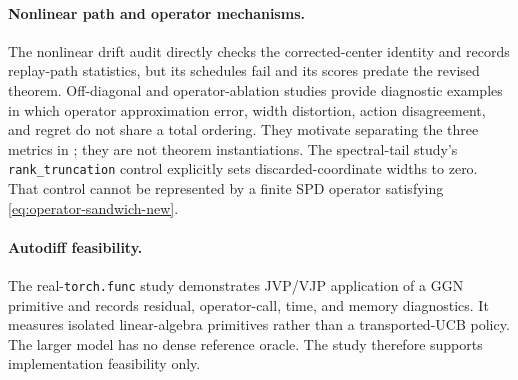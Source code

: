 \begin{table}[t]
  \centering\small
  
  \caption{Legacy fixed-reference linear right-hand-side to regret ratios.
  Each cell is a ratio of aggregate mean right-hand side to aggregate mean
  regret, not a mean of per-run ratios.  These values audit the earlier theorem
  and show numerical vacuity; they are not evaluations of the revised bound.
  Rows using unenclosed spectral or condition-number point estimates are not
  rigorous legacy certificates either.}
  \label{tab:compact-linear-bound-ratios}
\end{table}

\paragraph{Nonlinear path and operator mechanisms.}
The nonlinear drift audit directly checks the corrected-center identity and
records replay-path statistics, but its schedules fail and its scores predate
the revised theorem.  Off-diagonal and operator-ablation studies provide
diagnostic examples in which operator approximation error, width distortion,
action disagreement, and regret do not share a total ordering.  They motivate
separating the three metrics in ; they are not
theorem instantiations.  The spectral-tail study's
\texttt{rank\_truncation} control explicitly sets discarded-coordinate widths
to zero.  That control cannot be represented by a finite SPD operator satisfying
\eqref{eq:operator-sandwich-new}.

\paragraph{Autodiff feasibility.}
The real-\texttt{torch.func} study demonstrates JVP/VJP application of a GGN
primitive and records residual, operator-call, time, and memory diagnostics.
It measures isolated linear-algebra primitives rather than a transported-UCB
policy.  The larger model has no dense reference oracle.  The study therefore
supports implementation feasibility only.

\begin{table}[t]
  \centering\scriptsize
  \caption{Legacy real-autodiff resource audit at history size $512$, ten
  actions, and iterative-solver target original-system residual $10^{-3}$.
  Values summarize the isolated primitive; no dense-reference accuracy is
  imputed for the larger model.}
  \label{tab:compact-autodiff-summary}
  
\end{table}

